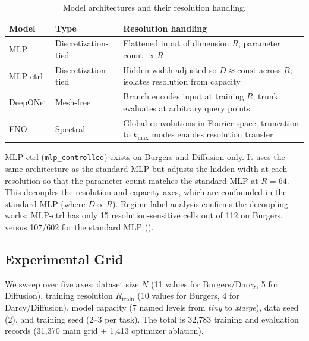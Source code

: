\documentclass[11pt]{article}
\newcommand{\Rtrain}{R_{\mathrm{train}}}
\newcommand{\totalRuns}{32{,}783}
\newcommand{\mainRuns}{31{,}370}
\newcommand{\ablationRuns}{1{,}413}
\begin{document}
\begin{table}[h]
\centering
\caption{Model architectures and their resolution handling.}
\label{tab:models}
\begin{tabular}{@{}llp{7cm}@{}}
\toprule
\textbf{Model} & \textbf{Type} & \textbf{Resolution handling} \\
\midrule
MLP & Discretization-tied &
  Flattened input of dimension $R$; parameter count $\propto R$ \\
MLP-ctrl & Discretization-tied &
  Hidden width adjusted so $D \approx \text{const}$ across $R$;
  isolates resolution from capacity \\
DeepONet & Mesh-free &
  Branch encodes input at training $R$; trunk evaluates at arbitrary
  query points \\
FNO & Spectral &
  Global convolutions in Fourier space; truncation to $k_{\max}$ modes
  enables resolution transfer \\
\bottomrule
\end{tabular}
\end{table}

\noindent
MLP-ctrl (\texttt{mlp\_controlled}) exists on Burgers and Diffusion
only. It uses the same architecture as the standard MLP but adjusts the
hidden width at each resolution so that the parameter count matches the
standard MLP at $R{=}64$. This decouples the resolution and capacity
axes, which are confounded in the standard MLP (where $D \propto R$).
Regime-label analysis confirms the decoupling works: MLP-ctrl has only
15 resolution-sensitive cells out of 112 on Burgers, versus 107/602 for
the standard MLP ().

\subsection{Experimental Grid}

We sweep over five axes: dataset size $N$ (11 values for Burgers/Darcy,
5 for Diffusion), training resolution $\Rtrain$ (10 values for Burgers,
4 for Darcy/Diffusion), model capacity (7 named levels from
\emph{tiny} to \emph{xlarge}), data seed (2), and training seed
(2--3 per task). The total is \totalRuns{} training and evaluation
records (\mainRuns{} main grid + \ablationRuns{} optimizer ablation).
\end{document}
